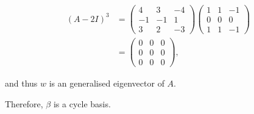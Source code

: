\documentclass[11pt]{scrartcl}
\begin{document}
\begin{soln}
\begin{align}
(A-2I)^3 &=
           \begin{pmatrix}
             4 & 3 & -4\\
             -1 & -1 & 1\\
             3 & 2 & -3
           \end{pmatrix}
           \begin{pmatrix}
             1 & 1 & -1\\
             0 & 0 & 0\\
             1 & 1 & -1
           \end{pmatrix}\\
           &=
             \begin{pmatrix}
               0 & 0 & 0\\
               0 & 0 & 0\\
               0 & 0 & 0
             \end{pmatrix},
\end{align}

and thus $w$ is an generalised eigenvector of $A$.

Therefore, $\beta$ is a cycle basis.
\end{soln}
\end{document}
